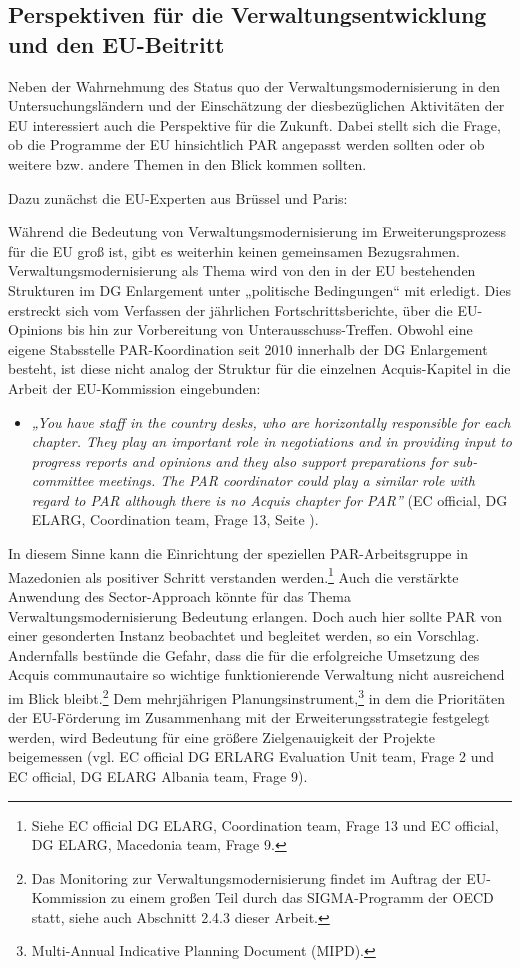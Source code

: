 \subsection{Perspektiven für die Verwaltungsentwicklung und den EU-Beitritt }
Neben der Wahrnehmung des Status quo der Verwaltungsmodernisierung in den Untersuchungsländern und der Einschätzung der diesbezüglichen Aktivitäten der EU interessiert auch die Perspektive für die Zukunft. Dabei stellt sich die Frage, ob die Programme der EU hinsichtlich PAR angepasst werden sollten oder ob weitere bzw. andere Themen in den Blick kommen sollten.\par
Dazu zunächst die EU-Experten aus Brüssel und Paris: \par
Während die Bedeutung von Verwaltungsmodernisierung im Erweiterungsprozess für die EU groß ist, gibt es weiterhin keinen gemeinsamen Bezugsrahmen. Verwaltungsmodernisierung als Thema wird von den in der EU bestehenden Strukturen im DG Enlargement unter „politische Bedingungen“ mit erledigt. Dies erstreckt sich vom Verfassen der jährlichen Fortschrittsberichte, über die EU-Opinions bis hin zur Vorbereitung von Unterausschuss-Treffen. Obwohl eine eigene Stabsstelle PAR-Koordination seit 2010 innerhalb der DG Enlargement besteht, ist diese nicht analog der Struktur für die einzelnen Acquis-Kapitel in die Arbeit der EU-Kommission eingebunden:
\begin{itemize}[label={}]
\item \textit{„You have staff in the country desks, who are horizontally responsible for each chapter. They play an important role in negotiations and in providing input to progress reports and opinions and they also support preparations for sub-committee meetings. The PAR coordinator could play a similar role with regard to PAR although there is no Acquis chapter for PAR”} (EC official, DG ELARG, Coordination team, Frage 13, Seite \pageref{sec:montenegro3}).
\end{itemize}
In diesem Sinne kann die Einrichtung der speziellen PAR-Arbeitsgruppe in Mazedonien als positiver Schritt verstanden werden.\footnote{Siehe EC official DG ELARG, Coordination team, Frage 13 und EC official, DG ELARG, Macedonia team, Frage 9.} Auch die verstärkte Anwendung des Sector-Approach könnte für das Thema Verwaltungsmodernisierung Bedeutung erlangen. Doch auch hier sollte PAR von einer gesonderten Instanz beobachtet und begleitet werden, so ein Vorschlag. Andernfalls bestünde die Gefahr, dass die für die erfolgreiche Umsetzung des Acquis communautaire so wichtige funktionierende Verwaltung nicht ausreichend im Blick bleibt.\footnote{Das Monitoring zur Verwaltungsmodernisierung findet im Auftrag der EU-Kommission zu einem großen Teil durch das SIGMA-Programm der OECD statt, siehe auch Abschnitt 2.4.3 dieser Arbeit.} Dem mehrjährigen Planungsinstrument,\footnote{Multi-Annual Indicative Planning Document (MIPD).} in dem die Prioritäten der EU-Förderung im Zusammenhang mit der Erweiterungsstrategie festgelegt werden, wird Bedeutung für eine größere Zielgenauigkeit der Projekte beigemessen (vgl. EC official DG ERLARG Evaluation Unit team, Frage 2 und EC official, DG ELARG Albania team, Frage 9).

